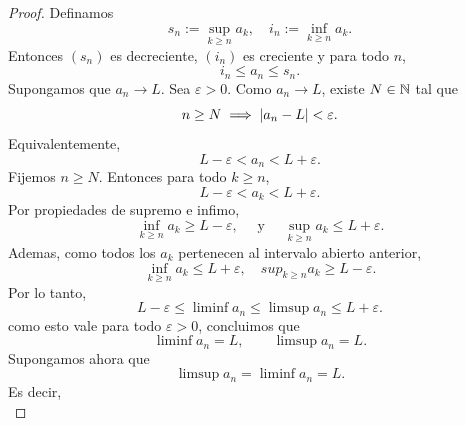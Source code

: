 \documentclass[12pt,a4paper]{article}
\begin{document}
    \begin{proof}
        Definamos
        \begin{equation*}
            s_{n}:=\sup_{k\geq n}a_{k},\quad i_{n}:=\inf_{k\geq n}a_{k}.
        \end{equation*}
        Entonces $(s_{n})$ es decreciente, $(i_{n})$ es creciente y para todo $n$,
        \begin{equation*}
            i_{n}\leq a_{n}\leq s_{n}.
        \end{equation*}
        Supongamos que $a_{n}\to L$. Sea $\varepsilon\gt0$. Como $a_{n}\to L$, existe $N\in\mathbb{N}$ tal que
        \begin{equation*}
            n\geq N\implies\abs{a_{n}-L}<\varepsilon.
        \end{equation*}
        Equivalentemente,
        \begin{equation*}
            L-\varepsilon\lt a_{n}\lt L+\varepsilon.
        \end{equation*}
        Fijemos $n\geq N$. Entonces para todo $k\geq n$,
        \begin{equation*}
            L-\varepsilon\lt a_{k}\lt L+\varepsilon.
        \end{equation*}
        Por propiedades de supremo e infimo,
        \begin{equation*}
            \inf_{k\geq n}a_{k}\geq L-\varepsilon,\quad\text{ y }\quad\sup_{k\geq n}a_{k}\leq L+\varepsilon.
        \end{equation*}
        Ademas, como todos los $a_{k}$ pertenecen al intervalo abierto anterior,
        \begin{equation*}
            \inf_{k\geq n}a_{k}\leq L+\varepsilon,\quad sup_{k\geq n}a_{k}\geq L-\varepsilon.
        \end{equation*}
        Por lo tanto,
        \begin{equation*}
            L-\varepsilon\leq\liminf a_{n}\leq\limsup a_{n}\leq L+\varepsilon.
        \end{equation*}
        como esto vale para todo $\varepsilon\gt0$, concluimos que
        \begin{equation*}
            \liminf a_{n}=L,\qquad\limsup a_{n}=L.
        \end{equation*}
        Supongamos ahora que
        \begin{equation*}
            \limsup a_{n}=\liminf a_{n}=L.
        \end{equation*}
        Es decir,
        \begin{equation*}

\end{equation*}
\end{proof}
\end{document}

